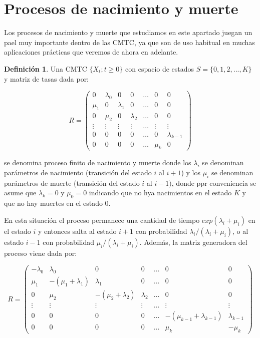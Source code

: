 \documentclass[
]{book}
\newenvironment{yellowbox}{
  \definecolor{shadecolor}{rgb}{210, 180, 140}  
  \color{black}
  \begin{shaded}}
 {\end{shaded}}
\theoremstyle{definition}
\newtheorem{definition}{Definición}[chapter]
\theoremstyle{definition}
\theoremstyle{definition}
\theoremstyle{definition}
\theoremstyle{remark}
\begin{document}
\hypertarget{CMTCD}{%
\section{Procesos de nacimiento y muerte}\label{CMTCD}}

Los procesos de nacimiento y muerte que estudiamos en este apartado juegan un pael muy importante dentro de las CMTC, ya que son de uso habitual en muchas aplicaciones prácticas que veremos de ahora en adelante.

\begin{yellowbox}

\begin{definition}
\protect\hypertarget{def:cmtc002}{}\label{def:cmtc002}Una CMTC \(\{X_t; t \geq 0\}\) con espacio de estados \(S = \{0, 1, 2,...,K\}\) y matriz de tasas dada por:

\[R = 
\begin{pmatrix}
0 & \lambda_0 & 0 & 0 & \ldots & 0 & 0 \\
\mu_1 & 0 & \lambda_1 & 0 & \ldots & 0 & 0 \\
0 & \mu_2 & 0 & \lambda_2 & \ldots & 0 & 0 \\
\vdots & \vdots & \vdots & \vdots & \ldots & \vdots & \vdots \\
0 & 0 & 0 & 0 & \ldots & 0 & \lambda_{k-1} \\
0 & 0 & 0 & 0 & \ldots &\mu_k & 0
\end{pmatrix} \]

se denomina proceso finito de nacimiento y muerte donde los \(\lambda_i\) se denominan parámetros de nacimiento (transición del estado \(i\) al \(i+1\)) y los \(\mu_i\) se denominan parámetros de muerte (transición del estado \(i\) al \(i-1)\), donde ppr conveniencia se asume que \(\lambda_k = 0\) y \(\mu_0 = 0\) indicando que no hya nacimientos en el estado \(K\) y que no hay muertes en el estado \(0\).
\end{definition}

\end{yellowbox}

En esta situación el proceso permanece una cantidad de tiempo \(exp(\lambda_i + \mu_i)\) en el estado \(i\) y entonces salta al estado \(i+1\) con probabilidad \(\lambda_i/(\lambda_i + \mu_i)\), o al estado \(i-1\) con probabilidad \(\mu_i/(\lambda_i + \mu_i)\). Además, la matriz generadora del proceso viene dada por:

\[R = 
\begin{pmatrix}
- \lambda_0& \lambda_0 & 0 & 0 & \ldots & 0 & 0 \\
\mu_1 & -(\mu_1 + \lambda_1) & \lambda_1 & 0 & \ldots & 0 & 0 \\
0 & \mu_2 & -(\mu_2 + \lambda_2) & \lambda_2 & \ldots & 0 & 0 \\
\vdots & \vdots & \vdots & \vdots & \ldots & \vdots & \vdots \\
0 & 0 & 0 & 0 & \ldots & -(\mu_{k-1} + \lambda_{k-1}) & \lambda_{k-1} \\
0 & 0 & 0 & 0 & \ldots & \mu_k & -\mu_k
\end{pmatrix} \]
\end{document}
